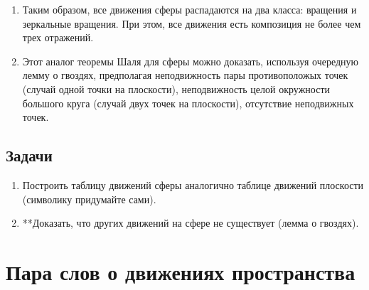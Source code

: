 \begin{enumerate}
\item Таким образом, все движения сферы распадаются на два класса: вращения и зеркальные вращения. При этом, все движения есть композиция не более чем трех отражений.
\item Этот аналог теоремы Шаля для сферы можно доказать, используя очередную лемму о гвоздях, предполагая неподвижность пары противоположых точек (случай одной точки на плоскости), неподвижность целой окружности большого круга (случай двух точек на плоскости), отсутствие неподвижных точек.
\end{enumerate}

\subsection*{Задачи}
\begin{enumerate}
\item Построить таблицу движений сферы аналогично таблице движений плоскости (символику придумайте сами).
\item **Доказать, что других движений на сфере не существует (лемма о гвоздях).
\end{enumerate}


\section{Пара слов о движениях пространства}





